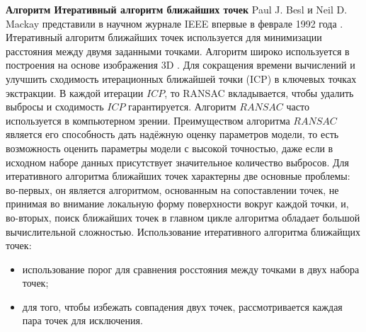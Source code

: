 \textbf{Алгоритм Итеративный алгоритм ближайших точек} Paul J. Besl и Neil D. Mackay представили в научном журнале IEEE впервые в феврале 1992 года \cite{Besl1992}. Итеративный алгоритм ближайших точек  используется для минимизации расстояния между двумя заданными точками. Алгоритм широко используется в построения на основе изображения 3D \cite{Gelfan2003, Rusinkiewicz2001}. Для сокращения времени вычислений и улучшить сходимость итерационных ближайшей точки (ICP) в ключевых точках экстракции. В каждой итерации $ICP$, то RANSAC \cite{Hast2013} вкладывается, чтобы удалить выбросы и сходимость $ICP$ гарантируется.  Алгоритм $RANSAC$ часто используется в компьютерном зрении. Преимуществом алгоритма $RANSAC$ является его способность дать надёжную оценку параметров модели, то есть возможность оценить параметры модели с высокой точностью, даже если в исходном наборе данных присутствует значительное количество выбросов. Для итеративного алгоритма ближайших точек характерны две основные проблемы: во-первых, он является алгоритмом, основанным на сопоставлении точек, не принимая во внимание локальную форму поверхности вокруг каждой точки, и, во-вторых, поиск ближайших точек в главном цикле алгоритма обладает большой вычислительной сложностью. Использование итеративного алгоритма ближайщих точек:
\begin{itemize}
	\item использование порог для сравнения росстояния между точками в двух набора точек;
	\item для того, чтобы избежать совпадения двух точек, рассмотривается каждая пара точек для исключения.
\end{itemize}
 

